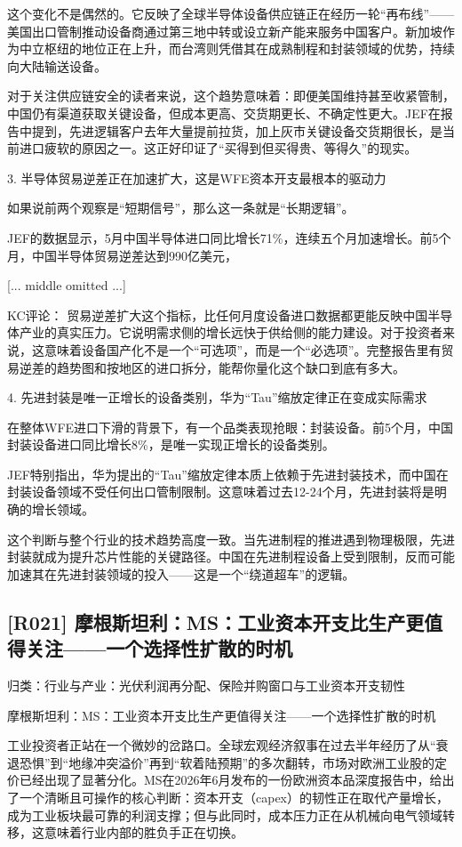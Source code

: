 \documentclass[11pt]{ctexart}
\begin{document}
这个变化不是偶然的。它反映了全球半导体设备供应链正在经历一轮“再布线”——美国出口管制推动设备商通过第三地中转或设立新产能来服务中国客户。新加坡作为中立枢纽的地位正在上升，而台湾则凭借其在成熟制程和封装领域的优势，持续向大陆输送设备。

对于关注供应链安全的读者来说，这个趋势意味着：即便美国维持甚至收紧管制，中国仍有渠道获取关键设备，但成本更高、交货期更长、不确定性更大。JEF在报告中提到，先进逻辑客户去年大量提前拉货，加上灰市关键设备交货期很长，是当前进口疲软的原因之一。这正好印证了“买得到但买得贵、等得久”的现实。

3. 半导体贸易逆差正在加速扩大，这是WFE资本开支最根本的驱动力

如果说前两个观察是“短期信号”，那么这一条就是“长期逻辑”。

JEF的数据显示，5月中国半导体进口同比增长71\%，连续五个月加速增长。前5个月，中国半导体贸易逆差达到990亿美元，

[... middle omitted ...]



KC评论： 贸易逆差扩大这个指标，比任何月度设备进口数据都更能反映中国半导体产业的真实压力。它说明需求侧的增长远快于供给侧的能力建设。对于投资者来说，这意味着设备国产化不是一个“可选项”，而是一个“必选项”。完整报告里有贸易逆差的趋势图和按地区的进口拆分，能帮你量化这个缺口到底有多大。

4. 先进封装是唯一正增长的设备类别，华为“Tau”缩放定律正在变成实际需求

在整体WFE进口下滑的背景下，有一个品类表现抢眼：封装设备。前5个月，中国封装设备进口同比增长8\%，是唯一实现正增长的设备类别。

JEF特别指出，华为提出的“Tau”缩放定律本质上依赖于先进封装技术，而中国在封装设备领域不受任何出口管制限制。这意味着过去12-24个月，先进封装将是明确的增长领域。

这个判断与整个行业的技术趋势高度一致。当先进制程的推进遇到物理极限，先进封装就成为提升芯片性能的关键路径。中国在先进制程设备上受到限制，反而可能加速其在先进封装领域的投入——这是一个“绕道超车”的逻辑。

\subsection{[R021] 摩根斯坦利：MS：工业资本开支比生产更值得关注——一个选择性扩散的时机}
{\small\color{refgray}归类：行业与产业：光伏利润再分配、保险并购窗口与工业资本开支韧性}

摩根斯坦利：MS：工业资本开支比生产更值得关注——一个选择性扩散的时机

工业投资者正站在一个微妙的岔路口。全球宏观经济叙事在过去半年经历了从“衰退恐惧”到“地缘冲突溢价”再到“软着陆预期”的多次翻转，市场对欧洲工业股的定价已经出现了显著分化。MS在2026年6月发布的一份欧洲资本品深度报告中，给出了一个清晰且可操作的核心判断：资本开支（capex）的韧性正在取代产量增长，成为工业板块最可靠的利润支撑；但与此同时，成本压力正在从机械向电气领域转移，这意味着行业内部的胜负手正在切换。
\end{document}
